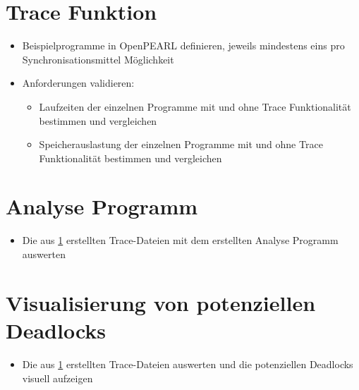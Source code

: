 \section{Trace Funktion}\label{Validierung:Trace Funktion}
\begin{itemize}
  \item Beispielprogramme in OpenPEARL definieren, jeweils mindestens eins pro
  Synchronisationsmittel Möglichkeit
  \item Anforderungen validieren:
  \begin{itemize}
    \item Laufzeiten der einzelnen Programme mit und ohne Trace Funktionalität
    bestimmen und vergleichen
    \item Speicherauslastung der einzelnen Programme mit und ohne Trace
    Funktionalität bestimmen und vergleichen
  \end{itemize}
\end{itemize}

\section{Analyse Programm}
\begin{itemize}
  \item Die aus \ref{Validierung:Trace Funktion} erstellten Trace-Dateien mit
  dem erstellten Analyse Programm auswerten
\end{itemize}

\section{Visualisierung von potenziellen Deadlocks}
\begin{itemize}
  \item Die aus \ref{Validierung:Trace Funktion} erstellten Trace-Dateien
  auswerten und die potenziellen Deadlocks visuell aufzeigen
\end{itemize}